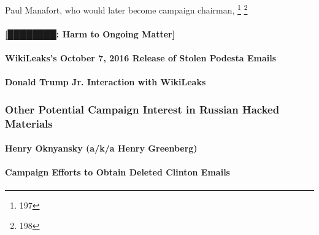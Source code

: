 Paul Manafort, who would later become campaign chairman, %
\footnote{197}
\footnote{198}

\paragraph{[████████: Harm to Ongoing Matter]}

\paragraph{WikiLeaks's October 7, 2016 Release of Stolen Podesta Emails}

\paragraph{Donald Trump Jr. Interaction with WikiLeaks}

\subsubsection{Other Potential Campaign Interest in Russian Hacked Materials}

\paragraph{Henry Oknyansky (a/k/a Henry Greenberg)}

\paragraph{Campaign Efforts to Obtain Deleted Clinton Emails}


